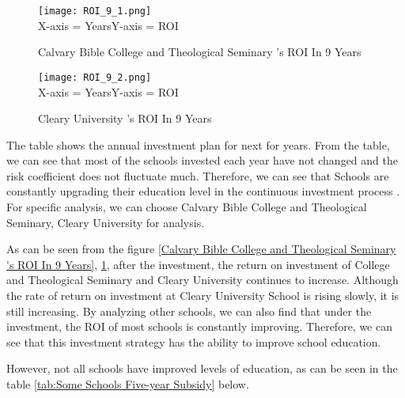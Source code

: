 \documentclass{mcmthesis}
\begin{document}
\begin{figure}[htbp]  
\begin{minipage}[t]{0.5\textwidth}
\centering  
\texttt{[image: ROI\_9\_1.png]} \\
X-axis = Years\quad Y-axis = ROI
\caption{Calvary Bible College and Theological Seminary 's  ROI In 9 Years} 
\label{Calvary Bible College and Theological Seminary 's  ROI In 9 Years}
\end{minipage}
\hspace{1ex}
\begin{minipage}[t]{0.5\textwidth}  
\centering  
\texttt{[image: ROI\_9\_2.png]}\\
X-axis = Years\quad Y-axis = ROI
\caption{Cleary University 's ROI In 9 Years}  \label{Cleary University 's ROI In 9 Years}
\end{minipage}  
\end{figure} 

\newpage

\par The table shows the annual investment plan for next for years. From the table, we can see that most of the schools invested each year have not changed and the risk coefficient does not fluctuate much. Therefore, we can see that Schools are constantly upgrading their education level in the continuous investment process . For specific analysis, we can choose Calvary Bible College and Theological Seminary, Cleary University for analysis.

\par As can be seen from the figure \ref{Calvary Bible College and Theological Seminary 's  ROI In 9 Years}, \ref{Cleary University 's ROI In 9 Years}, after the investment, the return on investment of College and Theological Seminary and Cleary University continues to increase. Although the rate of return on investment at Cleary University School is rising slowly, it is still increasing. By analyzing other schools, we can also find that under the investment, the ROI of most schools is constantly improving. Therefore, we can see that this investment strategy has the ability to improve school education.

\par However, not all schools have improved levels of education, as can be seen in the table \ref{tab:Some Schools Five-year Subsidy} below.
\end{document}
